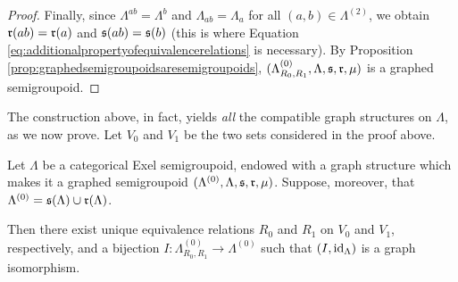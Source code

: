 \begin{proof}
Finally, since $\Lambda^{ab}=\Lambda^b$ and $\Lambda_{ab}=\Lambda_a$ for all $(a,b)\in\Lambda^{(2)}$, we obtain $\operatorname{\mathfrak{r}}(ab)=\operatorname{\mathfrak{r}}(a)$ and $\operatorname{\mathfrak{s}}(ab)=\operatorname{\mathfrak{s}}(b)$ (this is where Equation \eqref{eq:additionalpropertyofequivalencerelations} is necessary). By Proposition \ref{prop:graphedsemigroupoidsaresemigroupoids}, $(\Lambda_{R_0,R_1}^{(0)},\Lambda,\operatorname{\mathfrak{s}},\operatorname{\mathfrak{r}},\mu)$ is a graphed semigroupoid.\qedhere
\end{proof}

The construction above, in fact, yields \emph{all} the compatible graph structures on $\Lambda$, as we now prove. Let $V_0$ and $V_1$ be the two sets considered in the proof above.

\begin{proposition}\label{prop:classificationofgraphsoncategorical}
Let $\Lambda$ be a categorical Exel semigroupoid, endowed with a graph structure which makes it a graphed semigroupoid $(\Lambda^{(0)},\Lambda,\operatorname{\mathfrak{s}},\operatorname{\mathfrak{r}},\mu)$. Suppose, moreover, that $\Lambda^{(0)}=\operatorname{\mathfrak{s}}(\Lambda)\cup\operatorname{\mathfrak{r}}(\Lambda)$.

Then there exist unique equivalence relations $R_0$ and $R_1$ on $V_0$ and $V_1$, respectively, and a bijection $I\colon\Lambda_{R_0,R_1}^{(0)}\to\Lambda^{(0)}$ such that $(I,\operatorname{id}_{\Lambda})$ is a graph isomorphism.
\end{proposition}
